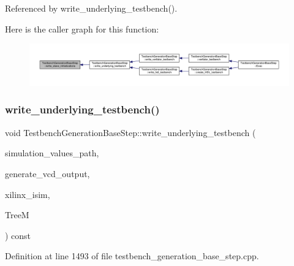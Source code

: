 Referenced by write\+\_\+underlying\+\_\+testbench().

Here is the caller graph for this function\+:
\nopagebreak
\begin{figure}[H]
\begin{center}
\leavevmode
\includegraphics[width=350pt]{dc/d02/classTestbenchGenerationBaseStep_ae67ccd4b5e09cbd14bd2218330161d3e_icgraph}
\end{center}
\end{figure}
\mbox{\label{classTestbenchGenerationBaseStep_a6feec8a1c8dc902e8b9644a956f878a4}} 
\subsubsection{\texorpdfstring{write\+\_\+underlying\+\_\+testbench()}{write\_underlying\_testbench()}}
{\footnotesize\ttfamily void Testbench\+Generation\+Base\+Step\+::write\+\_\+underlying\+\_\+testbench (\begin{DoxyParamCaption}\item[{std\+::string}]{simulation\+\_\+values\+\_\+path,  }\item[{bool}]{generate\+\_\+vcd\+\_\+output,  }\item[{bool}]{xilinx\+\_\+isim,  }\item[{const \hyperlink{tree__manager_8hpp_a792e3f1f892d7d997a8d8a4a12e39346}{tree\+\_\+manager\+Const\+Ref}}]{TreeM }\end{DoxyParamCaption}) const\hspace{0.3cm}{\ttfamily [protected]}}



Definition at line 1493 of file testbench\+\_\+generation\+\_\+base\+\_\+step.\+cpp.




